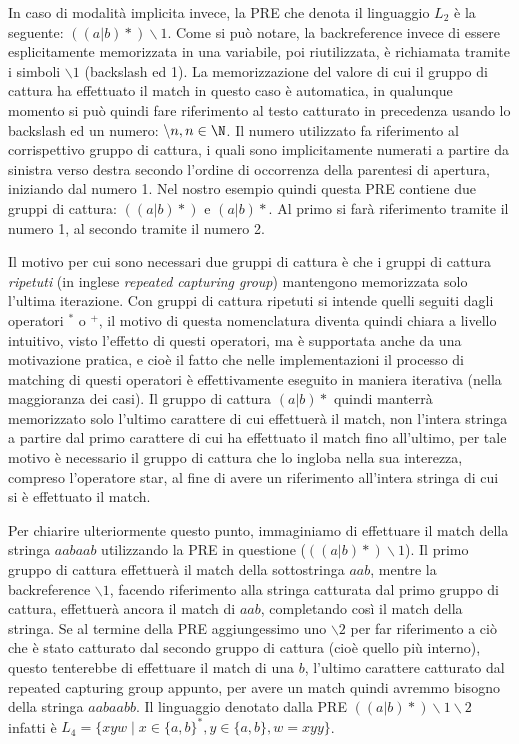 In caso di modalità implicita invece, la PRE che denota il linguaggio $L_2$ è la seguente: $((a|b)*)\backslash1$. Come si può notare, la backreference invece di essere esplicitamente memorizzata in una variabile, poi riutilizzata, è richiamata tramite i simboli $\backslash1$ (backslash ed 1). La memorizzazione del valore di cui il gruppo di cattura ha effettuato il match in questo caso è automatica, in qualunque momento si può quindi fare riferimento al testo catturato in precedenza usando lo backslash ed un numero: $\backslash n, n \in \N$. Il numero utilizzato fa riferimento al corrispettivo gruppo di cattura, i quali sono implicitamente numerati a partire da sinistra verso destra secondo l'ordine di occorrenza della parentesi di apertura, iniziando dal numero \num{1}. Nel nostro esempio quindi questa PRE contiene due gruppi di cattura: $((a|b)*)$ e $(a|b)*$. Al primo si farà riferimento tramite il numero \num{1}, al secondo tramite il numero \num{2}.

Il motivo per cui sono necessari due gruppi di cattura è che i gruppi di cattura \textit{ripetuti} (in inglese \foreignlanguage{english}{\textit{repeated capturing group}}) mantengono memorizzata solo l'ultima iterazione. Con gruppi di cattura ripetuti si intende quelli seguiti dagli operatori $^*$ o $^+$, il motivo di questa nomenclatura diventa quindi chiara a livello intuitivo, visto l'effetto di questi operatori, ma è supportata anche da una motivazione pratica, e cioè il fatto che nelle implementazioni il processo di matching di questi operatori è effettivamente eseguito in maniera iterativa (nella maggioranza dei casi). Il gruppo di cattura $(a|b)*$ quindi manterrà memorizzato solo l'ultimo carattere di cui effettuerà il match, non l'intera stringa a partire dal primo carattere di cui ha effettuato il match fino all'ultimo, per tale motivo è necessario il gruppo di cattura che lo ingloba nella sua interezza, compreso l'operatore star, al fine di avere un riferimento all'intera stringa di cui si è effettuato il match.

Per chiarire ulteriormente questo punto, immaginiamo di effettuare il match della stringa $aabaab$ utilizzando la PRE in questione ($((a|b)*)\backslash1$). Il primo gruppo di cattura effettuerà il match della sottostringa $aab$, mentre la backreference $\backslash1$, facendo riferimento alla stringa catturata dal primo gruppo di cattura, effettuerà ancora il match di $aab$, completando così il match della stringa. Se al termine della PRE aggiungessimo uno $\backslash2$ per far riferimento a ciò che è stato catturato dal secondo gruppo di cattura (cioè quello più interno), questo tenterebbe di effettuare il match di una $b$, l'ultimo carattere catturato dal repeated capturing group appunto, per avere un match quindi avremmo bisogno della stringa $aabaabb$. Il linguaggio denotato dalla PRE $((a|b)*)\backslash1\backslash2$ infatti è $L_4 = \{xyw \mid x \in \{a, b\}^*, y \in \{a, b\}, w = xyy\}$.


